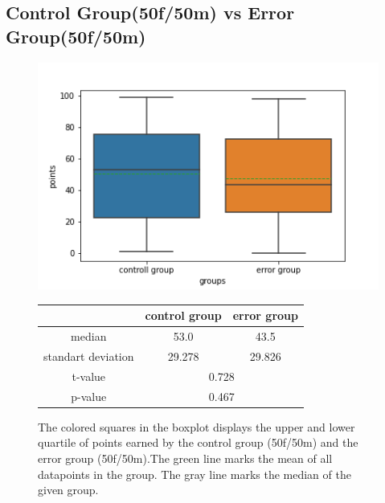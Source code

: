 \documentclass[runningheads]{llncs}
\begin{document}
\subsection{Control Group(50f/50m) vs Error Group(50f/50m)}
\begin{figure}[!h]
    \begin{minipage}{0.43\textwidth}        
        \includegraphics[width=\textwidth]{code/generate/all.png}
        \caption{The colored squares in the boxplot displays
        the upper and lower quartile of points earned by the control group (50f/50m) and
        the error group (50f/50m).The green line marks the mean of all datapoints in the group.
        The gray line marks the median  of the given group.} \label{fig2}
    \end{minipage}
\hfill
\begin{minipage}{0.43\textwidth}
\begin{tabular}[]{| c | c | c |}
        \hline
        & control group & error group \\
        \hline
        median & 53.0&43.5 \\
        \hline
        standart deviation & 29.278&29.826 \\
        \hline
        t-value & \multicolumn{2}{c|}{0.728} \\
        \hline
        p-value & \multicolumn{2}{c|}{0.467} \\
        \hline            
\end{tabular}
\end{minipage}
\end{figure}
\end{document}
